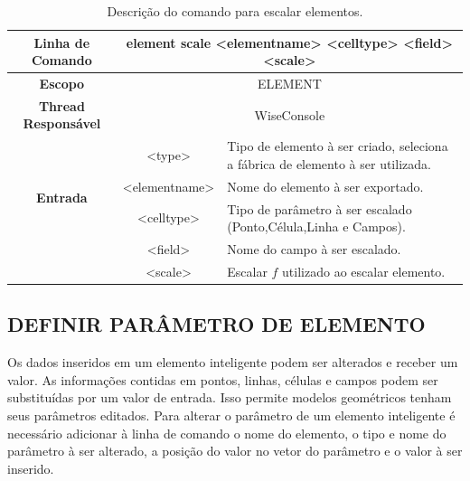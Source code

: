 \begin{center}
	\begin{table}[!htbp]
		\begin{tabular}{|c|c|m{}|}
			\hline
			\textbf{Linha de Comando} & \multicolumn{2}{c|}{element scale <element\underline{\space\space}name> <cell\underline{\space\space}type> <field> <scale>} \\
			\hline
			\textbf{Escopo} & \multicolumn{2}{c|}{ELEMENT} \\
			\hline
			\textbf{Thread Responsável} & \multicolumn{2}{c|}{WiseConsole} \\
			\hline
			\multirow{4}{*}{\textbf{Entrada}} & <type> & Tipo de elemento à ser criado, seleciona a fábrica de elemento à ser utilizada. \\
			
			& <element\underline{\space\space}name> & Nome do elemento à ser exportado. \\
			& <cell\underline{\space\space}type> & Tipo de parâmetro à ser escalado (Ponto,Célula,Linha e Campos). \\
			& <field> & Nome do campo à ser escalado. \\
			& <scale> & Escalar $f$ utilizado ao escalar elemento. \\
			\hline
		\end{tabular}
		\caption{Descrição do comando para escalar elementos.}
		\label{tab:scale_element}
	\end{table}
\end{center}

\subsection{DEFINIR PARÂMETRO DE ELEMENTO}\label{sec:set_field_element}

Os dados inseridos em um elemento inteligente podem ser alterados e receber um valor. As informações contidas em pontos, linhas, células e campos podem ser substituídas por um valor de entrada. Isso permite modelos geométricos tenham seus parâmetros editados. Para alterar o parâmetro de um elemento inteligente é necessário adicionar à linha de comando o nome do elemento, o tipo e nome do parâmetro à ser alterado, a posição do valor no vetor do parâmetro e o valor à ser inserido.

